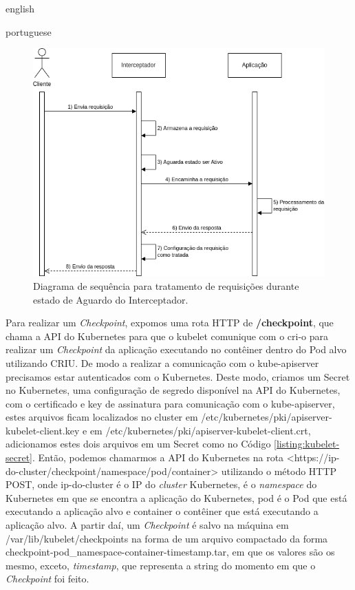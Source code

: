 \begin{otherlanguage*}{english}
\begin{otherlanguage*}{portuguese}
\begin{figure}[h]
\centering
\includegraphics[scale=0.46]{images/wait-state.png}
\caption{Diagrama de sequência para tratamento de requisições durante estado de Aguardo do Interceptador.}
\label{fig:diagram-wait-state-interceptor}
\end{figure}

Para realizar um \textit{Checkpoint}, expomos uma rota HTTP de \textbf{/checkpoint}, que
chama a API do Kubernetes para que o kubelet comunique com o cri-o para realizar um 
\textit{Checkpoint} da aplicação executando no contêiner dentro do Pod alvo utilizando
CRIU. De modo a realizar a comunicação com o kube-apiserver precisamos estar autenticados
com o Kubernetes. Deste modo, criamos um Secret no Kubernetes, uma configuração de segredo
disponível na API do Kubernetes, com o certificado e key de assinatura para comunicação
com o kube-apiserver, estes arquivos ficam localizados no cluster em
/etc/kubernetes/pki/apiserver-kubelet-client.key e em
/etc/kubernetes/pki/apiserver-kubelet-client.crt, adicionamos estes dois arquivos em um
Secret como no Código \ref{listing:kubelet-secret}. Então, podemos chamarmos a API
do Kubernetes na rota <https://ip-do-cluster/checkpoint/namespace/pod/container>
utilizando o método HTTP POST, onde ip-do-cluster é o IP do \textit{cluster} Kubernetes,
é o \textit{namespace} do Kubernetes em que se encontra a aplicação do Kubernetes, pod é
o Pod que está executando a aplicação alvo e container o contêiner que está executando a
aplicação alvo. A partir daí, um \textit{Checkpoint} é salvo na máquina em
/var/lib/kubelet/checkpoints na forma de um arquivo compactado da forma
checkpoint-pod\_namespace-container-timestamp.tar, em que os valores são os mesmo,
exceto, \textit{timestamp}, que representa a string do momento em que o \textit{Checkpoint}
foi feito.


\end{otherlanguage*}
\end{otherlanguage*}
